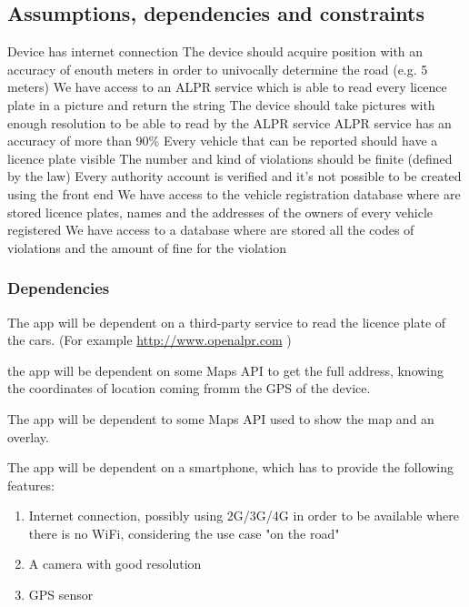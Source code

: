 \subsection{Assumptions, dependencies and constraints}
\begin{enumerate}
  Device has internet connection
 The device should acquire position with an accuracy of enouth meters in order to univocally determine the road (e.g. 5 meters)
\dom{} We have access to an ALPR service which is able to read every licence plate in a picture and return the string
 The device should take pictures with enough resolution to be able to read by the ALPR service
 ALPR service has an accuracy of more than 90\%
 Every vehicle that can be reported should have a licence plate visible
 The number and kind of violations should be finite (defined by the law)
 Every authority account is verified and it's not possible to be created using the front end
 We have access to the vehicle registration database where are stored licence plates, names and the addresses of the owners of every vehicle registered
 We have access to a database where are stored all the codes of violations and the amount of fine for the violation

\end{enumerate}

\subsubsection{Dependencies} \label{Dependencies}


The app will be dependent on a third-party service to read the licence plate of the cars. (For example \url{http://www.openalpr.com} )

the app will be dependent on some Maps API to get the full address, knowing the coordinates of location coming fromm the GPS of the device.

The app will be dependent to some Maps API used to show the map and an overlay.



The app will be dependent on a smartphone, which has to provide the following features:
\begin{enumerate}
  \item Internet connection, possibly using 2G/3G/4G in order to be available where there is no WiFi, considering the use case "on the road"
  \item A camera with good resolution
  \item GPS sensor
\end{enumerate}
